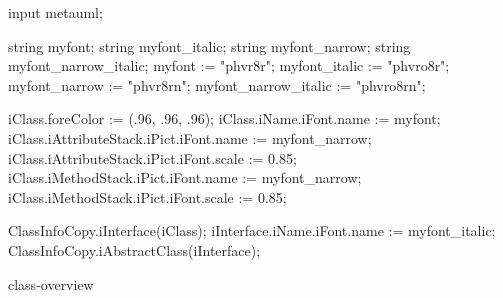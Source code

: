 \documentclass[a4paper,10pt]{book}
\begin{document}
\begin{titlepage}
\vspace*{7cm}
\begin{center}
{\Large A Node Architecture for Netlet Execution}\\
\vspace*{1cm}
{\large Denis Martin\\
	Helge Backhaus\\
	Peter Baumung\\
	Benjamin Behringer\\
	Gorka Hernando Garcia\\
	Hans Wippel}\\
\vspace*{0.5cm}
{\small $date}\\
\end{center}
\end{titlepage}

\clearemptydoublepage
{}
\tableofcontents
\clearemptydoublepage
{}


\begin{empfile}

\begin{empcmds}
input metauml;

string myfont;
string myfont_italic;
string myfont_narrow;
string myfont_narrow_italic;
myfont := "phvr8r";
myfont_italic := "phvro8r";
myfont_narrow := "phvr8rn";
myfont_narrow_italic := "phvro8rn";

iClass.foreColor := (.96, .96, .96);
iClass.iName.iFont.name := myfont;
iClass.iAttributeStack.iPict.iFont.name := myfont_narrow;
iClass.iAttributeStack.iPict.iFont.scale := 0.85;
iClass.iMethodStack.iPict.iFont.name := myfont_narrow;
iClass.iMethodStack.iPict.iFont.scale := 0.85;

ClassInfoCopy.iInterface(iClass);
iInterface.iName.iFont.name := myfont_italic;
ClassInfoCopy.iAbstractClass(iInterface);

\end{empcmds}

{class-overview}

\end{empfile}

\end{document}

